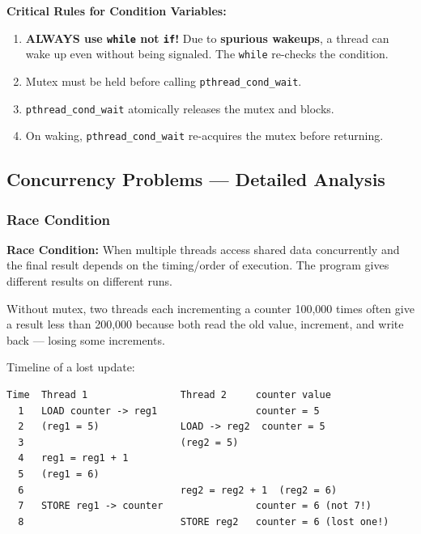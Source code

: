 \documentclass[11pt,a4paper]{article}
\newcommand{\code}[1]{\texttt{\small\colorbox{codebg}{\color{codekw}#1}}}
\newcommand{\term}[1]{\textbf{\color{darkblue}#1}}
\begin{document}
\textbf{Critical Rules for Condition Variables:}
\begin{enumerate}[noitemsep]
  \item \textbf{ALWAYS use \code{while} not \code{if}!} Due to \term{spurious wakeups}, a thread can wake up even without being signaled. The \code{while} re-checks the condition.
  \item Mutex must be held before calling \code{pthread\_cond\_wait}.
  \item \code{pthread\_cond\_wait} atomically releases the mutex and blocks.
  \item On waking, \code{pthread\_cond\_wait} re-acquires the mutex before returning.
\end{enumerate}

\subsection{Concurrency Problems --- Detailed Analysis}

\subsubsection{Race Condition}

\begin{mydef}
\textbf{Race Condition:} When multiple threads access shared data concurrently and the final result depends on the timing/order of execution. The program gives different results on different runs.
\end{mydef}

\begin{myexample}
Without mutex, two threads each incrementing a counter 100,000 times often give a result less than 200,000 because both read the old value, increment, and write back --- losing some increments.

Timeline of a lost update:
\begin{lstlisting}[style=bashstyle]
Time  Thread 1                Thread 2     counter value
  1   LOAD counter -> reg1                 counter = 5
  2   (reg1 = 5)              LOAD -> reg2  counter = 5
  3                           (reg2 = 5)
  4   reg1 = reg1 + 1
  5   (reg1 = 6)
  6                           reg2 = reg2 + 1  (reg2 = 6)
  7   STORE reg1 -> counter                counter = 6 (not 7!)
  8                           STORE reg2   counter = 6 (lost one!)
\end{lstlisting}
\end{myexample}
\end{document}
